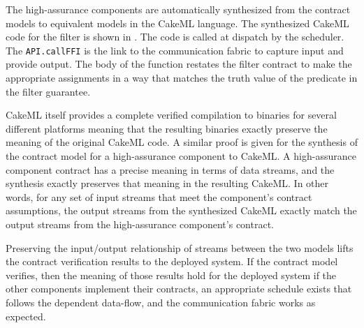 The high-assurance components are automatically synthesized from the contract models to equivalent models in the CakeML language. The synthesized CakeML code for the filter is shown in . The code is called at dispatch by the scheduler. The \texttt{API.callFFI} is the link to the communication fabric to capture input and provide output. The body of the function restates the filter contract to make the appropriate assignments in a way that matches the truth value of the predicate in the filter guarantee.

CakeML itself provides a complete verified compilation to binaries for several different platforms meaning that the resulting binaries exactly preserve the meaning of the original CakeML code. A similar proof is given for the synthesis of the contract model for a high-assurance component to CakeML. A high-assurance component contract has a precise meaning in terms of data streams, and the synthesis exactly preserves that meaning in the resulting CakeML. In other words, for any set of input streams that meet the component's contract assumptions, the output streams from the synthesized CakeML exactly match the output streams from the high-assurance component's contract. 

Preserving the input/output relationship of streams between the two models lifts the contract verification results to the deployed system. If the contract model verifies, then the meaning of those results hold for the deployed system if the other components implement their contracts, an appropriate schedule exists that follows the dependent data-flow, and the communication fabric works as expected.
